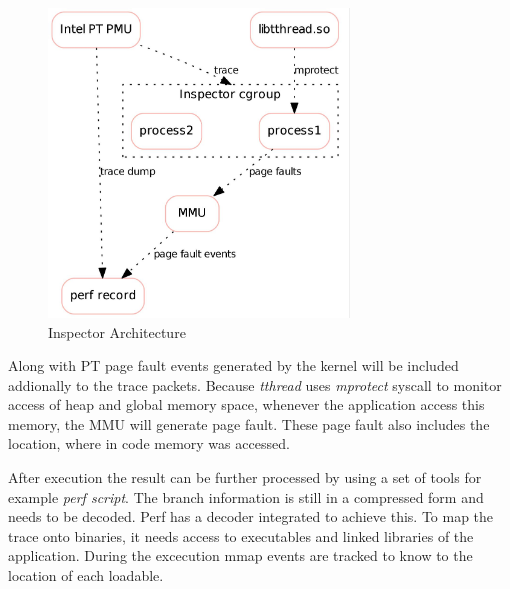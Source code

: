 \begin{figure}[h]
\includegraphics[width=8cm]{figure/arch2.jpg}
\caption{Inspector Architecture}
\label{fig:inspector}
\end{figure}

Along with PT page fault events generated by the kernel will be included
addionally to the trace packets. Because \emph{tthread} uses \emph{mprotect}
syscall to monitor access of heap and global memory space, whenever the
application access this memory, the MMU will generate page fault. These
page fault also includes the location, where in code memory was accessed.

After execution the result can be further processed by using a set of tools
for example \emph{perf script}. The branch information is still in a compressed
form and needs to be decoded. Perf has a decoder integrated to achieve this.
To map the trace onto binaries, it needs access to executables and linked
libraries of the application. During the excecution mmap events are tracked to
know to the location of each loadable.
